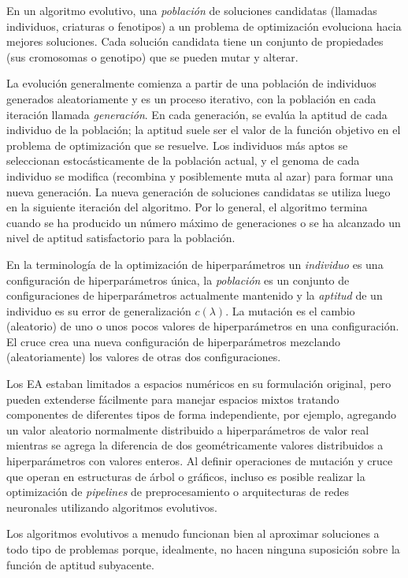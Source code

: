 En un algoritmo evolutivo, una \textit{población} de soluciones candidatas (llamadas individuos, criaturas o fenotipos) a un problema de optimización evoluciona hacia mejores soluciones. Cada solución candidata tiene un conjunto de propiedades (sus cromosomas o genotipo) que se pueden mutar y alterar.

La evolución generalmente comienza a partir de una población de individuos generados aleatoriamente y es un proceso iterativo, con la población en cada iteración llamada \textit{generación}. En cada generación, se evalúa la aptitud de cada individuo de la población; la aptitud suele ser el valor de la función objetivo en el problema de optimización que se resuelve. Los individuos más aptos se seleccionan estocásticamente de la población actual, y el genoma de cada individuo se modifica (recombina y posiblemente muta al azar) para formar una nueva generación. La nueva generación de soluciones candidatas se utiliza luego en la siguiente iteración del algoritmo. Por lo general, el algoritmo termina cuando se ha producido un número máximo de generaciones o se ha alcanzado un nivel de aptitud satisfactorio para la población.

En la terminología de la optimización de hiperparámetros un \textit{individuo} es una configuración de hiperparámetros única, la \textit{población} es un conjunto de configuraciones de hiperparámetros actualmente mantenido y la \textit{aptitud} de un individuo es su error de generalización $c(\lambda)$. La mutación es el cambio (aleatorio) de uno o unos pocos valores de hiperparámetros en una configuración. El cruce crea una nueva configuración de hiperparámetros mezclando (aleatoriamente) los valores de otras dos configuraciones.

Los EA estaban limitados a espacios numéricos en su formulación original, pero pueden extenderse fácilmente para manejar espacios mixtos tratando componentes de diferentes tipos de forma independiente, por ejemplo, agregando un valor aleatorio normalmente distribuido a hiperparámetros de valor real mientras se agrega la diferencia de dos geométricamente valores distribuidos a hiperparámetros con valores enteros. Al definir operaciones de mutación y cruce que operan en estructuras de árbol o gráficos, incluso es posible realizar la optimización de \emph{pipelines} de preprocesamiento o arquitecturas de redes neuronales utilizando algoritmos evolutivos.

Los algoritmos evolutivos a menudo funcionan bien al aproximar soluciones a todo tipo de problemas porque, idealmente, no hacen ninguna suposición sobre la función de aptitud subyacente. %


